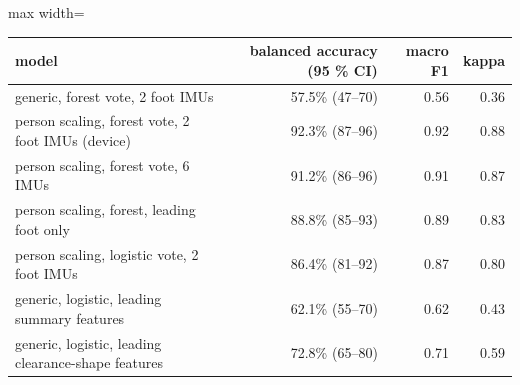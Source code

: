 \begin{adjustbox}{max width=\textwidth}
{\footnotesize
\begin{tabular}{p{7.4cm}rrr}
\toprule
\textbf{model} & \textbf{balanced accuracy (95 \% CI)} & \textbf{macro F1} & \textbf{kappa} \\
\midrule
generic, forest vote, 2 foot IMUs & 57.5\% (47--70) & 0.56 & 0.36 \\
person scaling, forest vote, 2 foot IMUs (device) & 92.3\% (87--96) & 0.92 & 0.88 \\
person scaling, forest vote, 6 IMUs & 91.2\% (86--96) & 0.91 & 0.87 \\
person scaling, forest, leading foot only & 88.8\% (85--93) & 0.89 & 0.83 \\
person scaling, logistic vote, 2 foot IMUs & 86.4\% (81--92) & 0.87 & 0.80 \\
generic, logistic, leading summary features & 62.1\% (55--70) & 0.62 & 0.43 \\
generic, logistic, leading clearance-shape features & 72.8\% (65--80) & 0.71 & 0.59 \\
\bottomrule
\end{tabular}
}
\end{adjustbox}
